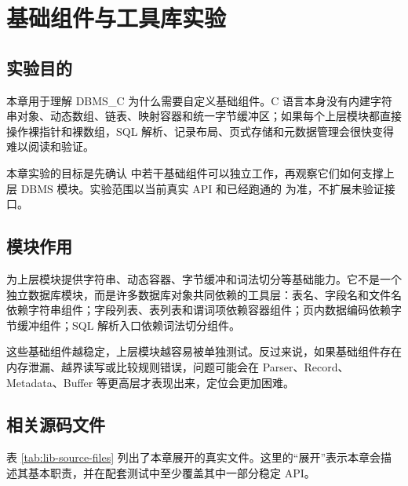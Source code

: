 \chapter{基础组件与工具库实验}
\label{chap:lib}

\section{实验目的}
\label{sec:lib-purpose}

本章用于理解 DBMS\_C 为什么需要自定义基础组件。C 语言本身没有内建字符串对象、动态数组、链表、映射容器和统一字节缓冲区；如果每个上层模块都直接操作裸指针和裸数组，SQL 解析、记录布局、页式存储和元数据管理会很快变得难以阅读和验证。

本章实验的目标是先确认  中若干基础组件可以独立工作，再观察它们如何支撑上层 DBMS 模块。实验范围以当前真实 API 和已经跑通的  为准，不扩展未验证接口。

\section{模块作用}
\label{sec:lib-role}

 为上层模块提供字符串、动态容器、字节缓冲和词法切分等基础能力。它不是一个独立数据库模块，而是许多数据库对象共同依赖的工具层：表名、字段名和文件名依赖字符串组件；字段列表、表列表和谓词项依赖容器组件；页内数据编码依赖字节缓冲组件；SQL 解析入口依赖词法切分组件。

这些基础组件越稳定，上层模块越容易被单独测试。反过来说，如果基础组件存在内存泄漏、越界读写或比较规则错误，问题可能会在 Parser、Record、Metadata、Buffer 等更高层才表现出来，定位会更加困难。

\section{相关源码文件}
\label{sec:lib-source-files}

表 \ref{tab:lib-source-files} 列出了本章展开的真实文件。这里的“展开”表示本章会描述其基本职责，并在配套测试中至少覆盖其中一部分稳定 API。

